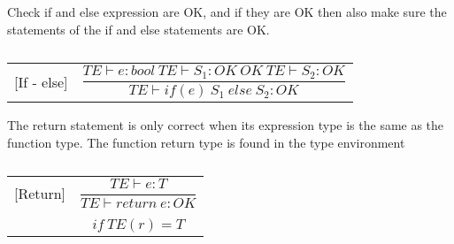 Check if and else expression are OK, and if they are OK then also make sure the statements of the if and else statements are OK.
\begin{table}[H]
    \begin{center}
    \begin{longtable}[c] { r c }
        [If - else] 
        & 
        \( \dfrac{T E  \vdash e  :  bool \ T E \vdash S_1 : OK \ OK \ T E \vdash S_2 : OK}
        {T E \vdash if(e) \ S_1 \ else \ S_2 : OK} \)

    \end{longtable}
    \caption{}\label{s-empty}
        \end{center}
\end{table}

The return statement is only correct when its expression type is the same as the function type. The function return type is found in the type environment
\begin{table}[H]
    \begin{center}
    \begin{longtable}[c] { r c }
        [Return] 
        & 
        \( \dfrac{T E  \vdash e  :  T}{T E \vdash return \ e : OK} \)
         \\ \\
        & 
        \( {if \ TE(r) = T } \)

    \end{longtable}
    \caption{}\label{s-empty}
        \end{center}
\end{table}








